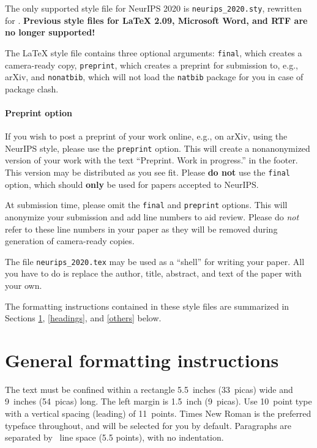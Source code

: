 \documentclass{article}
\begin{document}
The only supported style file for NeurIPS 2020 is \verb+neurips_2020.sty+,
rewritten for \LaTeXe{}.  \textbf{Previous style files for \LaTeX{} 2.09,
    Microsoft Word, and RTF are no longer supported!}

The \LaTeX{} style file contains three optional arguments: \verb+final+, which
creates a camera-ready copy, \verb+preprint+, which creates a preprint for
submission to, e.g., arXiv, and \verb+nonatbib+, which will not load the
\verb+natbib+ package for you in case of package clash.

\paragraph{Preprint option}
If you wish to post a preprint of your work online, e.g., on arXiv, using the
NeurIPS style, please use the \verb+preprint+ option. This will create a
nonanonymized version of your work with the text ``Preprint. Work in progress.''
in the footer. This version may be distributed as you see fit. Please \textbf{do
    not} use the \verb+final+ option, which should \textbf{only} be used for
papers accepted to NeurIPS.

At submission time, please omit the \verb+final+ and \verb+preprint+
options. This will anonymize your submission and add line numbers to aid
review. Please do \emph{not} refer to these line numbers in your paper as they
will be removed during generation of camera-ready copies.

The file \verb+neurips_2020.tex+ may be used as a ``shell'' for writing your
paper. All you have to do is replace the author, title, abstract, and text of
the paper with your own.

The formatting instructions contained in these style files are summarized in
Sections \ref{gen_inst}, \ref{headings}, and \ref{others} below.

\section{General formatting instructions}
\label{gen_inst}

The text must be confined within a rectangle 5.5~inches (33~picas) wide and
9~inches (54~picas) long. The left margin is 1.5~inch (9~picas).  Use 10~point
type with a vertical spacing (leading) of 11~points.  Times New Roman is the
preferred typeface throughout, and will be selected for you by default.
Paragraphs are separated by ~line space (5.5 points), with no
indentation.
\end{document}
